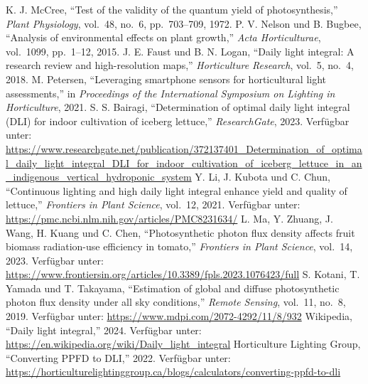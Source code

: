\documentclass[14pt,a4paper]{report}
\begin{document}
\begin{thebibliography}{99}
     K. J. McCree, ``Test of the validity of the quantum yield of photosynthesis,'' \emph{Plant Physiology}, vol.~48, no.~6, pp.~703--709, 1972.
     P. V. Nelson und B. Bugbee, ``Analysis of environmental effects on plant growth,'' \emph{Acta Horticulturae}, vol.~1099, pp.~1--12, 2015.
     J. E. Faust und B. N. Logan, ``Daily light integral: A research review and high-resolution maps,'' \emph{Horticulture Research}, vol.~5, no.~4, 2018.
     M. Petersen, ``Leveraging smartphone sensors for horticultural light assessments,'' in \emph{Proceedings of the International Symposium on Lighting in Horticulture}, 2021.
     S. S. Bairagi, ``Determination of optimal daily light integral (DLI) for indoor cultivation of iceberg lettuce,'' \emph{ResearchGate}, 2023. Verfügbar unter: \url{https://www.researchgate.net/publication/372137401_Determination_of_optimal_daily_light_integral_DLI_for_indoor_cultivation_of_iceberg_lettuce_in_an_indigenous_vertical_hydroponic_system}
     Y. Li, J. Kubota und C. Chun, ``Continuous lighting and high daily light integral enhance yield and quality of lettuce,'' \emph{Frontiers in Plant Science}, vol.~12, 2021. Verfügbar unter: \url{https://pmc.ncbi.nlm.nih.gov/articles/PMC8231634/}
     L. Ma, Y. Zhuang, J. Wang, H. Kuang und C. Chen, ``Photosynthetic photon flux density affects fruit biomass radiation-use efficiency in tomato,'' \emph{Frontiers in Plant Science}, vol.~14, 2023. Verfügbar unter: \url{https://www.frontiersin.org/articles/10.3389/fpls.2023.1076423/full}
     S. Kotani, T. Yamada und T. Takayama, ``Estimation of global and diffuse photosynthetic photon flux density under all sky conditions,'' \emph{Remote Sensing}, vol.~11, no.~8, 2019. Verfügbar unter: \url{https://www.mdpi.com/2072-4292/11/8/932}
     Wikipedia, ``Daily light integral,'' 2024. Verfügbar unter: \url{https://en.wikipedia.org/wiki/Daily_light_integral}
     Horticulture Lighting Group, ``Converting PPFD to DLI,'' 2022. Verfügbar unter: \url{https://horticulturelightinggroup.ca/blogs/calculators/converting-ppfd-to-dli}


\end{thebibliography}
\end{document}
